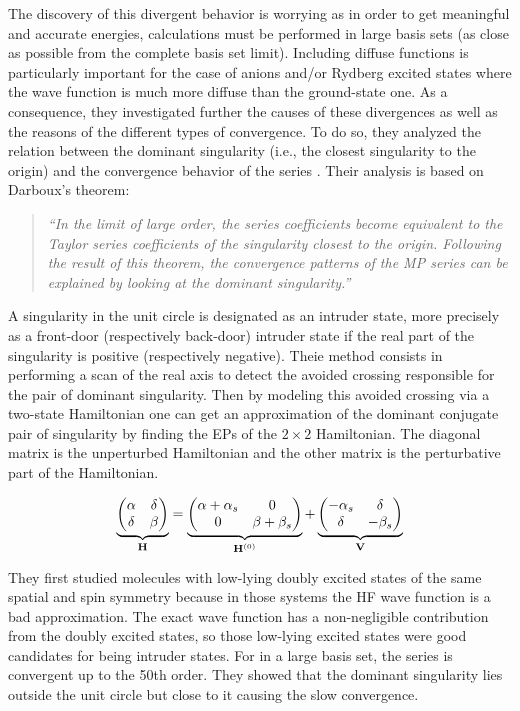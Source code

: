 \documentclass[11pt,a4paper]{article}
\newcommand{\bH}{\mathbf{H}}
\newcommand{\bV}{\mathbf{V}}
\begin{document}
The discovery of this divergent behavior is worrying as in order to get meaningful and accurate energies, calculations must be performed in large basis sets (as close as possible from the complete basis set limit). Including diffuse functions is particularly important for the case of anions and/or Rydberg excited states where the wave function is much more diffuse than the ground-state one. As a consequence, they investigated further the causes of these divergences as well as the reasons of the different types of convergence. To do so, they analyzed the relation between the dominant singularity (i.e., the closest singularity to the origin) and the convergence behavior of the series \cite{Olsen_2000}. Their analysis is based on Darboux's theorem: 
\begin{quote}
	\textit{``In the limit of large order, the series coefficients become equivalent to the Taylor series coefficients of the singularity closest to the origin. Following the result of this theorem, the convergence patterns of the MP series can be explained by looking at the dominant singularity.''}
\end{quote}

A singularity in the unit circle is designated as an intruder state, more precisely as a front-door (respectively back-door) intruder state if the real part of the singularity is positive (respectively negative). Theie method consists in performing a scan of the real axis to detect the avoided crossing responsible for the pair of dominant singularity. Then by modeling this avoided crossing via a two-state Hamiltonian one can get an approximation of the dominant conjugate pair of singularity by finding the EPs of the $2\times2$ Hamiltonian. The diagonal matrix is the unperturbed Hamiltonian and the other matrix is the perturbative part of the Hamiltonian.

\begin{equation}
\underbrace{\mqty(\alpha & \delta \\ \delta & \beta)}_{\bH} = \underbrace{\mqty(\alpha + \alpha_s & 0 \\ 0 & \beta + \beta_s )}_{\bH^{(0)}} + \underbrace{\mqty(- \alpha_s & \delta \\ \delta & - \beta_s)}_{\bV}
\end{equation}
 
They first studied molecules with low-lying doubly excited states of the same spatial and spin symmetry because in those systems the HF wave function is a bad approximation. The exact wave function has a non-negligible contribution from the doubly excited states, so those low-lying excited states were good candidates for being intruder states. For  in a large basis set, the series is convergent up to the 50th order. They showed that the dominant singularity lies outside the unit circle but close to it causing the slow convergence.
\end{document}
